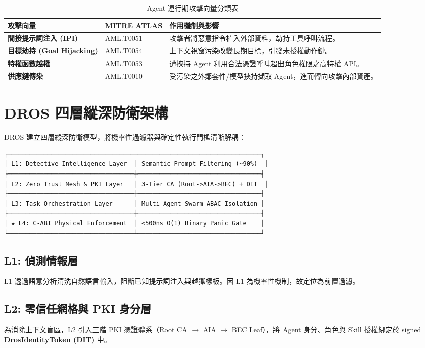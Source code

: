 \documentclass[conference]{IEEEtran}
\begin{document}
\begin{table}[htbp]
\caption{Agent 運行期攻擊向量分類表}
\begin{center}
\begin{tabular}{|p{2.2cm}|p{1.8cm}|p{3.5cm}|}
\hline
\textbf{攻擊向量} & \textbf{MITRE ATLAS} & \textbf{作用機制與影響} \\ \hline
\textbf{間接提示詞注入 (IPI)} & AML.T0051 & 攻擊者將惡意指令植入外部資料，劫持工具呼叫流程。 \\ \hline
\textbf{目標劫持 (Goal Hijacking)} & AML.T0054 & 上下文視窗污染改變長期目標，引發未授權動作鏈。 \\ \hline
\textbf{特權函數越權} & AML.T0053 & 遭挾持 Agent 利用合法憑證呼叫超出角色權限之高特權 API。 \\ \hline
\textbf{供應鏈傳染} & AML.T0010 & 受污染之外鄰套件/模型挾持擷取 Agent，進而轉向攻擊內部資產。 \\ \hline
\end{tabular}
\end{center}
\end{table}

\section{DROS 四層縱深防衛架構}
DROS 建立四層縱深防衛模型，將機率性過濾器與確定性執行門檻清晰解耦：

\begin{verbatim}
┌──────────────────────────────────────────────────────────────────────┐
│ L1: Detective Intelligence Layer  │ Semantic Prompt Filtering (~90%)  │
├───────────────────────────────────┼──────────────────────────────────┤
│ L2: Zero Trust Mesh & PKI Layer   │ 3-Tier CA (Root->AIA->BEC) + DIT  │
├───────────────────────────────────┼──────────────────────────────────┤
│ L3: Task Orchestration Layer      │ Multi-Agent Swarm ABAC Isolation │
├───────────────────────────────────┼──────────────────────────────────┤
│ ★ L4: C-ABI Physical Enforcement  │ <500ns O(1) Binary Panic Gate    │
└───────────────────────────────────┴──────────────────────────────────┘
\end{verbatim}

\subsection{L1: 偵測情報層}
L1 透過語意分析清洗自然語言輸入，阻斷已知提示詞注入與越獄樣板。因 L1 為機率性機制，故定位為前置過濾。

\subsection{L2: 零信任網格與 PKI 身分層}
為消除上下文盲區，L2 引入三階 PKI 憑證體系（Root CA $\to$ AIA $\to$ BEC Leaf），將 Agent 身分、角色與 Skill 授權綁定於 signed \textbf{DrosIdentityToken (DIT)} 中。
\end{document}
